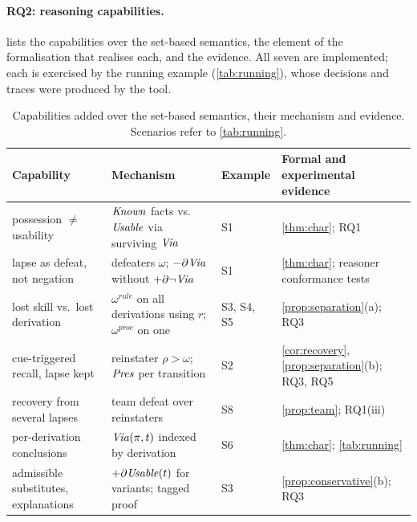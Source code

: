 \paragraph{RQ2: reasoning capabilities.}
 lists the capabilities over the set-based semantics, the element of the formalisation that realises each, and the evidence. All seven are implemented; each is exercised by the running example (\cref{tab:running}), whose decisions and traces were produced by the tool.

\begin{table}[t]
\centering\scriptsize
\caption{Capabilities added over the set-based semantics, their mechanism and evidence. Scenarios refer to \cref{tab:running}.}
\label{tab:capabilities}
\setlength{\tabcolsep}{3pt}
\begin{tabular}{@{}>{\raggedright\arraybackslash}p{2.7cm}>{\raggedright\arraybackslash}p{3.6cm}>{\raggedright\arraybackslash}p{1.1cm}>{\raggedright\arraybackslash}p{3.9cm}@{}}
\toprule
Capability & Mechanism & Example & Formal and experimental evidence \\
\midrule
possession $\neq$ usability & $\mathit{Known}$ facts vs.\ $\mathit{Usable}$ via surviving $\mathit{Via}$ & S1 & \cref{thm:char}; RQ1 \\
lapse as defeat, not negation & defeaters $\omega$; $-\partial\mathit{Via}$ without $+\partial\neg\mathit{Via}$ & S1 & \cref{thm:char}; reasoner conformance tests \\
lost skill vs.\ lost derivation & $\omega^{\mathit{rule}}$ on all derivations using $r$; $\omega^{\mathit{proc}}$ on one & S3, S4, S5 & \cref{prop:separation}(a); RQ3 \\
cue-triggered recall, lapse kept & reinstater $\rho>\omega$; $\mathit{Pres}$ per transition & S2 & \cref{cor:recovery}, \cref{prop:separation}(b); RQ3, RQ5 \\
recovery from several lapses & team defeat over reinstaters & S8 & \cref{prop:team}; RQ1(iii) \\
per-derivation conclusions & $\mathit{Via}(\pi,t)$ indexed by derivation & S6 & \cref{thm:char}; \cref{tab:running} \\
admissible substitutes, explanations & $+\partial\mathit{Usable}(t)$ for variants; tagged proof & S3 & \cref{prop:conservative}(b); RQ3 \\
\bottomrule
\end{tabular}
\end{table}


